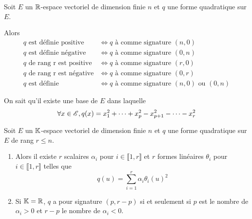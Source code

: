 \documentclass[a4paper,12pt]{article}
\begin{document}
\begin{proposition}{}{}
    Soit $E$ un $\mathbb{R}$-espace vectoriel de dimension finie $n$ et $q$ une forme quadratique sur $E$.

    Alors
    \begin{align*}
        q \text{ est définie positive} &\iff q \text{ à comme signature } (n, 0) \\
        q \text{ est définie négative} &\iff q \text{ à comme signature } (0, n) \\
        q \text{ de rang r est positive} &\iff q \text{ à comme signature } (r, 0) \\
        q \text{ de rang r est négative} &\iff q \text{ à comme signature } (0, r) \\
        q \text{ est définie} &\iff q \text{ à comme signature } (n, 0) \text{ ou } (0, n)
    \end{align*}
\end{proposition}

\begin{demonstration}
    On sait qu'il existe une base de $E$ dans laquelle
    $$
    \forall x \in \mathscr{E}, q(x) = x_1^2 + \cdots + x_p^2 - x_{p+1}^2 - \cdots - x_r^2
    $$
    
\end{demonstration}

\begin{theoreme}{}{}
    Soit $E$ un $\mathbb{K}$-espace vectoriel de dimension finie $n$ et $q$ une forme quadratique sur $E$ de rang $r \leq n$.

    \begin{enumerate}
        \item 
        Alors il existe $r$ scalaires $\alpha_i$ pour $i \in \llbracket 1, r \rrbracket$ et
        $r$ formes linéaires $\theta_i$ pour $i \in \llbracket 1, r \rrbracket$ telles que
        $$
        q(u) = \sum_{i=1}^r \alpha_i \theta_i(u)^2
        $$

        \item
        Si $\mathbb{K} = \mathbb{R}$, $q$ a pour signature $(p, r - p)$ si et seulement si $p$ est le nombre de $\alpha_i > 0$ et $r - p$ le nombre de $\alpha_i < 0$. 
\end{enumerate}
\end{theoreme}
\end{document}
